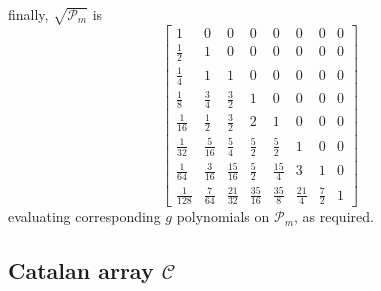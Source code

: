 finally, $\sqrt{\mathcal{P}_{m}}$ is
\begin{displaymath}
\left[\begin{matrix}1 & 0 & 0 & 0 & 0 & 0 & 0 & 0\\\frac{1}{2} & 1 & 0 & 0 & 0 & 0 & 0 & 0\\\frac{1}{4} & 1 & 1 & 0 & 0 & 0 & 0 & 0\\\frac{1}{8} & \frac{3}{4} & \frac{3}{2} & 1 & 0 & 0 & 0 & 0\\\frac{1}{16} & \frac{1}{2} & \frac{3}{2} & 2 & 1 & 0 & 0 & 0\\\frac{1}{32} & \frac{5}{16} & \frac{5}{4} & \frac{5}{2} & \frac{5}{2} & 1 & 0 & 0\\\frac{1}{64} & \frac{3}{16} & \frac{15}{16} & \frac{5}{2} & \frac{15}{4} & 3 & 1 & 0\\\frac{1}{128} & \frac{7}{64} & \frac{21}{32} & \frac{35}{16} & \frac{35}{8} & \frac{21}{4} & \frac{7}{2} & 1\end{matrix}\right]
\end{displaymath}
evaluating corresponding $g$ polynomials on $\mathcal{P}_{m}$, as required.



\subsection{Catalan array $\mathcal{C}$}

